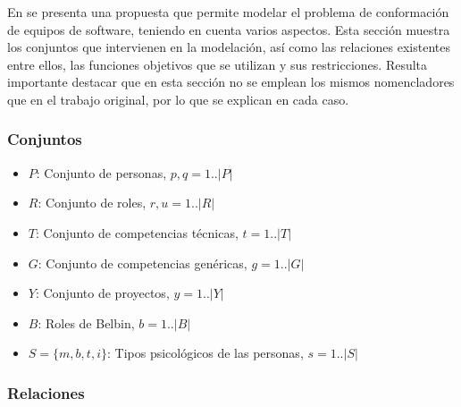 En \cite{Duran2019} se presenta una propuesta que permite modelar el problema de conformación de equipos de software, teniendo en cuenta varios aspectos. Esta sección muestra los conjuntos que intervienen en la modelación, así como las relaciones existentes entre ellos, las funciones objetivos que se utilizan y sus restricciones. Resulta importante destacar que en esta sección no se emplean los mismos nomencladores que en el trabajo original, por lo que se explican en cada caso.

\subsubsection{Conjuntos} \label{entidades}

\begin{itemize}
  \item $P$: Conjunto de personas, $p, q= 1.. |P|$
  \item $R$: Conjunto de roles, $r,u= 1.. |R|$
  \item $T$: Conjunto de competencias técnicas, $t= 1.. |T|$
  \item $G$: Conjunto de competencias genéricas, $g= 1.. |G|$
  \item $Y$: Conjunto de proyectos, $y= 1.. |Y|$
  \item $B$: Roles de Belbin, $b= 1.. |B|$
  \item $S= \{m,b,t,i\}$: Tipos psicológicos de las personas, $s= 1.. |S| $
\end{itemize}

\subsubsection{Relaciones} \label{relaciones}

